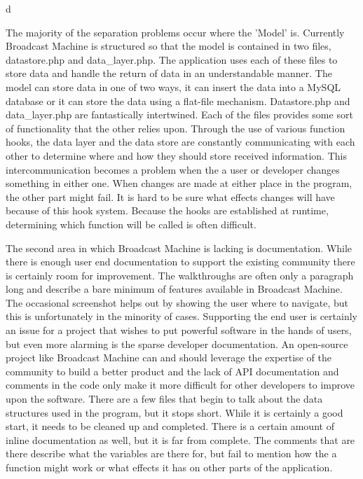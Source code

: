 d\documentclass[a4paper,12pt]{report}
\begin{document}
{{%
The majority of the separation problems occur where the 'Model' is. Currently Broadcast Machine is structured so that the model is contained in two files, datastore.php and data\_layer.php. The application uses each of these files to store data and handle the return of data in an understandable manner. The model can store data in one of two ways, it can insert the data into a MySQL database or it can store the data using a flat-file mechanism. Datastore.php and data\_layer.php are fantastically intertwined. Each of the files provides some sort of functionality that the other relies upon. Through the use of various function hooks, the data layer and the data store are constantly communicating with each other to determine where and how they should store received information. This intercommunication becomes a problem when the a user or developer changes something in either one. When changes are made at either place in the program, the other part might fail. It is hard to be sure what effects changes will have because of this hook system. Because the hooks are established at runtime, determining which function will be called is often difficult.
	
The second area in which Broadcast Machine is lacking is documentation. 
While there is enough user end documentation to support the existing community there is certainly room for improvement. 
The walkthroughs are often only a paragraph long and describe a bare minimum of features available in Broadcast Machine. 
The occasional screenshot helps out by showing the user where to navigate, but this is unfortunately in the minority of cases. 
Supporting the end user is certainly an issue for a project that wishes to put powerful software in the hands of users, but even more alarming is the sparse developer documentation. 
An open-source project like Broadcast Machine can and should leverage the expertise of the community to build a better product and the lack of API documentation and comments in the code only make it more difficult for other developers to improve upon the software. 
There are a few files that begin to talk about the data structures used in the program, but it stops short. 
While it is certainly a good start, it needs to be cleaned up and completed. There is a certain amount of inline documentation as well, but it is far from complete. 
The comments that are there describe what the variables are there for, but fail to mention how the a function might work or what effects it has on other parts of the application.
	
}}
\end{document}
